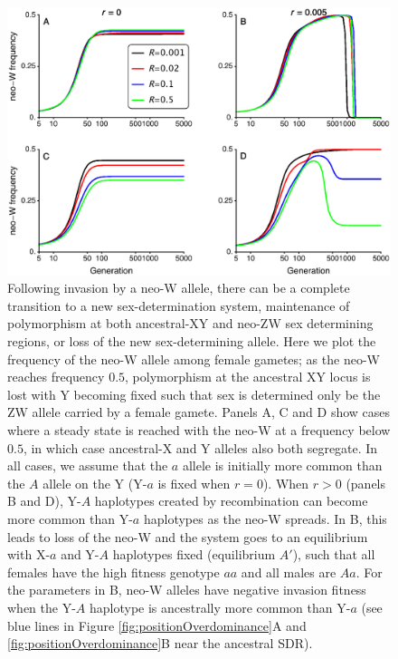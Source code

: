 \documentclass[12pt]{article}
\begin{document}
\newpage

\begin{figure}[!h]
\centering
\centerline{\includegraphics[width=\linewidth]{Temporal_Overdominance.eps}}
\caption{
Following invasion by a neo-W allele, there can be a complete transition to a new sex-determination system, maintenance of polymorphism at both ancestral-XY and neo-ZW sex determining regions, or loss of the new sex-determining allele. 
Here we plot the frequency of the neo-W allele among female gametes; as the neo-W reaches frequency $0.5$, polymorphism at the ancestral XY locus is lost with Y becoming fixed such that sex is determined only be the ZW allele carried by a female gamete. 
Panels A, C and D show cases where a steady state is reached with the neo-W at a frequency below $0.5$, in which case ancestral-X and Y alleles also both segregate. 
In all cases, we assume that the $a$ allele is initially more common than the $A$ allele on the Y (Y-$a$ is fixed when $r=0$). 
When $r>0$ (panels B and D), Y-$A$ haplotypes created by recombination can become more common than Y-$a$ haplotypes as the neo-W spreads.
In B, this leads to loss of the neo-W and the system goes to an equilibrium with X-$a$ and Y-$A$ haplotypes fixed (equilibrium $A'$), such that all females have the high fitness genotype $aa$ and all males are $Aa$. 
For the parameters in B, neo-W alleles have negative invasion fitness when the Y-$A$ haplotype is ancestrally more common than Y-$a$ (see blue lines in Figure \ref{fig:positionOverdominance}A and  \ref{fig:positionOverdominance}B near the ancestral SDR). 
}
\end{figure}
\end{document}
